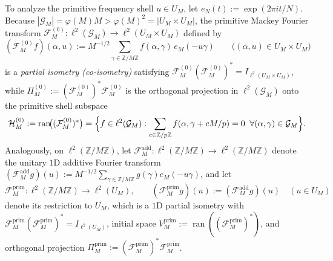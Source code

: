 \documentclass[11pt,a4paper]{article}
\numberwithin{equation}{section}
\theoremstyle{definition}
\theoremstyle{remark}
\newcommand{\Z}{\mathbb{Z}}
\newcommand{\cG}{\mathcal{G}}
\newcommand{\cF}{\mathcal{F}}
\newcommand{\cH}{\mathcal{H}}
\newcommand{\prim}{\mathrm{prim}}
\begin{document}
To analyze the primitive frequency shell $u \in U_M$, let $e_N(t) := \exp(2\pi i t / N)$. Because $|\cG_M| = \varphi(M)M > \varphi(M)^2 = |U_M \times U_M|$, the primitive Mackey Fourier transform $\cF_M^{(0)} : \ell^2(\cG_M) \to \ell^2(U_M \times U_M)$ defined by
\[
(\cF_M^{(0)} f)(\alpha, u) := M^{-1/2}\sum_{\gamma \in \Z/M\Z} f(\alpha, \gamma)\, e_M(-u\gamma) \qquad \bigl((\alpha, u) \in U_M \times U_M\bigr)
\]
is a \emph{partial isometry (co-isometry)} satisfying $\cF_M^{(0)}(\cF_M^{(0)})^* = I_{\ell^2(U_M\times U_M)}$, while $\Pi_M^{(0)} := (\cF_M^{(0)})^*\cF_M^{(0)}$ is the orthogonal projection in $\ell^2(\cG_M)$ onto the primitive shell subspace
\[
\cH_M^{(0)} := \operatorname{ran}\!\bigl((\cF_M^{(0)})^*\bigr) = \Bigl\{f \in \ell^2(\cG_M) : \sum_{c \in \Z/p\Z} f(\alpha, \gamma + c M/p) = 0 \;\;\forall (\alpha, \gamma) \in \cG_M\Bigr\}.
\]
Analogously, on $\ell^2(\Z/M\Z)$, let $\cF_M^{\mathrm{add}} : \ell^2(\Z/M\Z) \to \ell^2(\Z/M\Z)$ denote the unitary $1$D additive Fourier transform $(\cF_M^{\mathrm{add}} g)(u) := M^{-1/2}\sum_{\gamma \in \Z/M\Z} g(\gamma) e_M(-u\gamma)$, and let
\[
\cF_M^{\prim} : \ell^2(\Z/M\Z) \longrightarrow \ell^2(U_M), \qquad (\cF_M^{\prim} g)(u) := (\cF_M^{\mathrm{add}} g)(u) \quad (u \in U_M)
\]
denote its restriction to $U_M$, which is a $1$D partial isometry with $\cF_M^{\prim}(\cF_M^{\prim})^* = I_{\ell^2(U_M)}$, initial space $V_M^{\prim} := \operatorname{ran}((\cF_M^{\prim})^*)$, and orthogonal projection $\Pi_M^{\prim} := (\cF_M^{\prim})^*\cF_M^{\prim}$.
\end{document}

